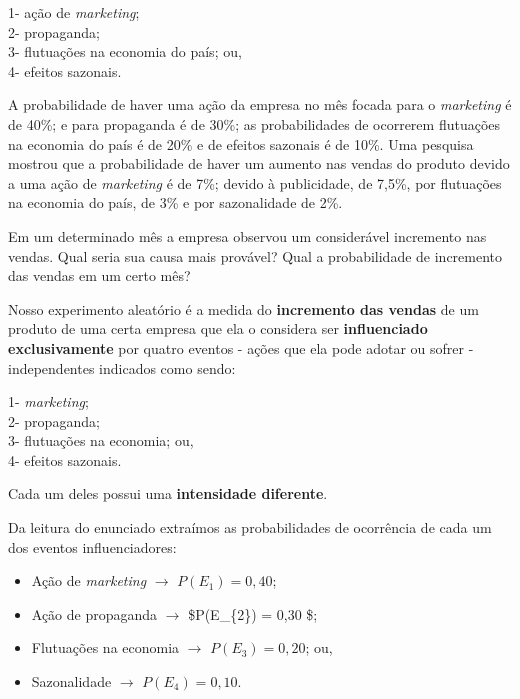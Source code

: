 \documentclass[
]{book}
\providecommand{\tightlist}{%
  \setlength{\itemsep}{0pt}\setlength{\parskip}{0pt}}
\begin{document}
\hfill\break

1- ação de \emph{marketing};\\
2- propaganda;\\
3- flutuações na economia do país; ou,\\
4- efeitos sazonais.

\hfill\break

A probabilidade de haver uma ação da empresa no mês focada para o \emph{marketing} é de 40\%; e para propaganda é de 30\%; as probabilidades de ocorrerem flutuações na economia do país é de 20\% e de efeitos sazonais é de 10\%. Uma pesquisa mostrou que a probabilidade de haver um aumento nas vendas do produto devido a uma ação de \emph{marketing} é de 7\%; devido à publicidade, de 7,5\%, por flutuações na economia do país, de 3\% e por sazonalidade de 2\%.

\hfill\break

Em um determinado mês a empresa observou um considerável incremento nas vendas. Qual seria sua causa mais provável? Qual a probabilidade de incremento das vendas em um certo mês?

\hfill\break

Nosso experimento aleatório é a medida do \textbf{incremento das vendas} de um produto de uma certa empresa que ela o considera ser \textbf{influenciado exclusivamente} por quatro eventos - ações que ela pode adotar ou sofrer - independentes indicados como sendo:

\hfill\break

1- \emph{marketing};\\
2- propaganda;\\
3- flutuações na economia; ou,\\
4- efeitos sazonais.

Cada um deles possui uma \textbf{intensidade diferente}.

\hfill\break

Da leitura do enunciado extraímos as probabilidades de ocorrência de cada um dos eventos influenciadores:

\hfill\break

\begin{itemize}
\tightlist
\item
  Ação de \emph{marketing} \(\rightarrow\) \(P(E_{1}) = 0,40\);\\
\item
  Ação de propaganda \(\rightarrow\) \$P(E\_\{2\}) = 0,30 \$;\\
\item
  Flutuações na economia \(\rightarrow\) \(P(E_{3}) = 0,20\); ou,\\
\item
  Sazonalidade \(\rightarrow\) \(P(E_{4}) = 0,10\).
\end{itemize}
\end{document}
